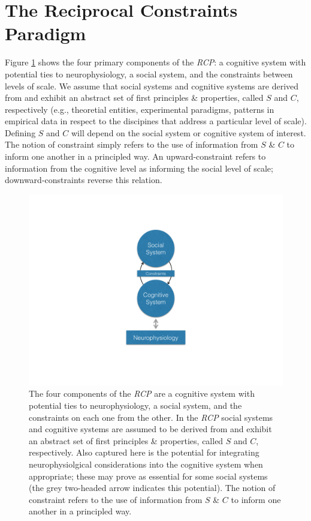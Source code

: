 \documentclass{article}
\begin{document}
\section{The Reciprocal Constraints Paradigm}
Figure \ref{fig:rcpdiagram} shows the four primary components of the \textit{RCP}: a cognitive system with potential ties to neurophysiology, a social system, and the constraints between levels of scale.  We assume that social systems and cognitive systems are derived from and exhibit an abstract set of first principles \& properties, called $S$ and $C$, respectively (e.g., theoretial entities, experimental paradigms, patterns in empirical data in respect to the discipines that address a particular level of scale).  Defining $S$ and $C$ will depend on the social system or cognitive system of interest.  The notion of constraint simply refers to the use of information from $S$ \& $C$ to inform one another in a principled way. An upward-constraint refers to information from the cognitive level as informing the social level of scale; downward-constraints reverse this relation.


\begin{figure}
	\centering
	\includegraphics[width=1.0\textwidth]{RCP_diagram.png}
	\caption{\label{fig:rcpdiagram} The four components of the \textit{RCP} are a cognitive system with potential ties to neurophysiology, a social system, and the constraints on each one from the other.  In the \textit{RCP} social systems and cognitive systems are assumed to be derived from and exhibit an abstract set of first principles \& properties, called $S$ and $C$, respectively.  Also captured here is the potential for integrating neurophysiolgical considerations into the cognitive system when appropriate; these may prove as essential for some social systems (the grey two-headed arrow indicates this potential). The notion of constraint refers to the use of information from $S$ \& $C$ to inform one another in a principled way.  
	}
\end{figure}
\end{document}
